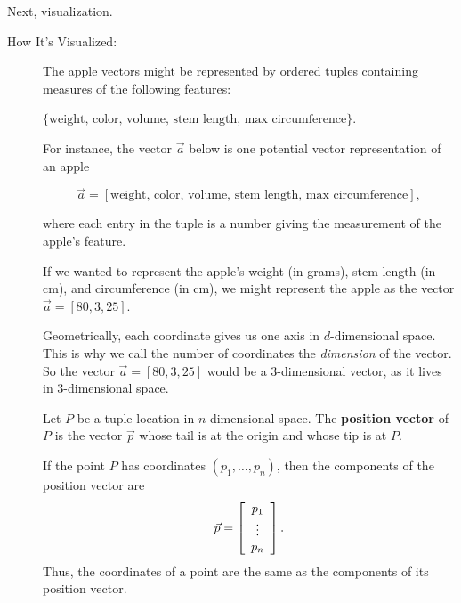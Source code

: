\documentclass{ximera}
\begin{document}
\begin{remark}

  Next, visualization.

\begin{description}
    \item[How It's Visualized:] 
    
    The apple vectors might be represented by ordered tuples containing measures of the following features: 
    
    $\lbrace \text{weight, color, volume, stem length, max circumference} \rbrace$.
    
    For instance, the vector $\vec{a}$ below is one potential vector representation of an apple

    $$\vec{a}=[\text{weight, color, volume, stem length, max circumference}],$$

    where each entry in the tuple is a number giving the measurement of the apple's feature.

    If we wanted to represent the apple's weight (in grams), stem length (in cm), and circumference (in cm), we might represent the apple as the vector $\vec{a}=[80, 3, 25]$.

    Geometrically, each coordinate gives us one axis in $d$-dimensional space. This is why we call the number of coordinates the \textit{dimension} of the vector. So the vector $\vec{a}=[80, 3, 25]$ would be a 3-dimensional vector, as it lives in 3-dimensional space.

    \begin{definition}

      Let $P$ be a tuple location in $n$-dimensional space. The \textbf{position
        vector}%
       of $P$ is the vector
      $\vec{p}$ whose tail is at the origin and whose tip
      is at $P$.
      \begin{center}
      \end{center}
      If the point $P$ has coordinates $(p_1,\ldots,p_n)$, then the
      components of the position vector are
      \begin{equation*}
        \vec{p} =
        \startmat{c}
          p_1    \\
          \vdots \\
          p_n
        \stopmat.
      \end{equation*}
      Thus, the coordinates of a point are the same as the components of
      its position vector. 
      

\end{definition}
\end{description}
\end{remark}
\end{document}
